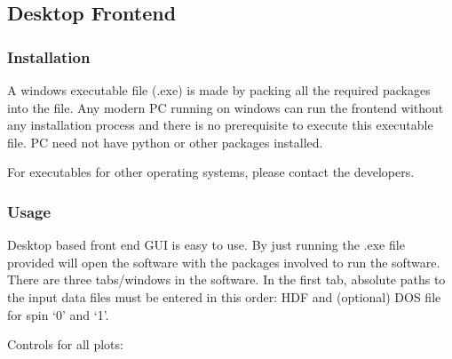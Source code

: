 \subsection{Desktop Frontend}\label{desktop-frontend}

\subsubsection{Installation}\label{installation}

A windows executable file (.exe) is made by packing all the required
packages into the file. Any modern PC running on windows can run the
frontend without any installation process and there is no prerequisite
to execute this executable file. PC need not have python or other
packages installed.

For executables for other operating systems, please contact the
developers.

\subsubsection{Usage}\label{usage}

Desktop based front end GUI is easy to use. By just running the .exe
file provided will open the software with the packages involved to run
the software. There are three tabs/windows in the software. In the first
tab, absolute paths to the input data files must be entered in this
order: HDF and (optional) DOS file for spin `0' and `1'.

Controls for all plots:

